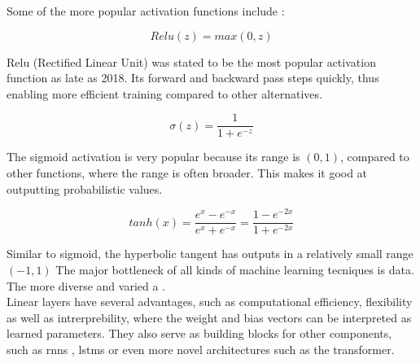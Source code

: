 Some of the more popular activation functions include \cite{szandala2021review}: 

\begin{equation}
    Relu(z) = max(0, z)
\end{equation}

Relu (Rectified Linear Unit) was stated to be the most popular activation function as late as 2018. Its forward and backward pass steps quickly, thus enabling more efficient training compared to other alternatives.

\begin{equation}
    \sigma(z) = \frac{1} {1 + e^{-z}}
\end{equation}

The sigmoid activation is very popular because its range is $(0,1)$, compared to other functions, where the range is often broader. This makes it good at outputting probabilistic values.

\begin{equation}
    tanh(x) = \frac{e^x - e^{-x}}{e^x + e^{-x}} = \frac{1 - e^{-2x}}{1 + e^{-2x}}
\end{equation}

Similar to sigmoid, the hyperbolic tangent has outputs in a relatively small range $(-1, 1)$
The major bottleneck of all kinds of machine learning tecniques is data. The more diverse and varied a . \\

Linear layers have several advantages, such as computational efficiency, flexibility as well as intrerprebility, where the weight and bias vectors can be interpreted as learned parameters. They also serve as building blocks for other components, such as \acrshort{rnn}s \cite{schmidt2019recurrent}, \acrshort{lstm}s \cite{lstm} or even more novel architectures such as the transformer\cite{vaswani2017attention}. \\ 

